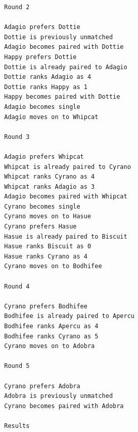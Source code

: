 \begin{enumerate}[label=(\alph*)]
\begin{lstlisting}
        Round 2
        
        Adagio prefers Dottie
        Dottie is previously unmatched
        Adagio becomes paired with Dottie
        Happy prefers Dottie
        Dottie is already paired to Adagio
        Dottie ranks Adagio as 4
        Dottie ranks Happy as 1
        Happy becomes paired with Dottie
        Adagio becomes single
        Adagio moves on to Whipcat
        
        Round 3
        
        Adagio prefers Whipcat
        Whipcat is already paired to Cyrano
        Whipcat ranks Cyrano as 4
        Whipcat ranks Adagio as 3
        Adagio becomes paired with Whipcat
        Cyrano becomes single
        Cyrano moves on to Hasue
        Cyrano prefers Hasue
        Hasue is already paired to Biscuit
        Hasue ranks Biscuit as 0
        Hasue ranks Cyrano as 4
        Cyrano moves on to Bodhifee
        
        Round 4
        
        Cyrano prefers Bodhifee
        Bodhifee is already paired to Apercu
        Bodhifee ranks Apercu as 4
        Bodhifee ranks Cyrano as 5
        Cyrano moves on to Adobra
        
        Round 5
        
        Cyrano prefers Adobra
        Adobra is previously unmatched
        Cyrano becomes paired with Adobra
        
        Results
        

\end{lstlisting}
\end{enumerate}
